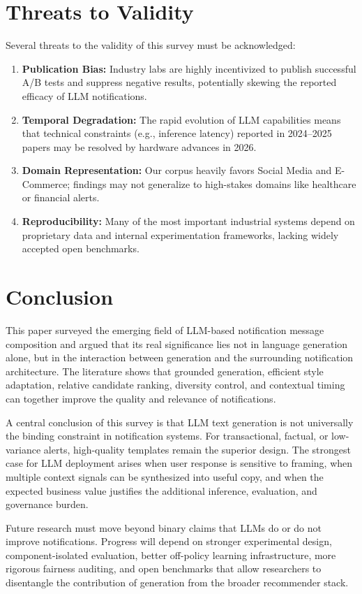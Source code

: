 \documentclass[sigconf]{acmart}
\begin{document}
\section{Threats to Validity}

Several threats to the validity of this survey must be acknowledged:
\begin{enumerate}
    \item \textbf{Publication Bias:} Industry labs are highly incentivized to publish successful A/B tests and suppress negative results, potentially skewing the reported efficacy of LLM notifications.
    \item \textbf{Temporal Degradation:} The rapid evolution of LLM capabilities means that technical constraints (e.g., inference latency) reported in 2024--2025 papers may be resolved by hardware advances in 2026.
    \item \textbf{Domain Representation:} Our corpus heavily favors Social Media and E-Commerce; findings may not generalize to high-stakes domains like healthcare or financial alerts.
    \item \textbf{Reproducibility:} Many of the most important industrial systems depend on proprietary data and internal experimentation frameworks, lacking widely accepted open benchmarks.
\end{enumerate}

\section{Conclusion}

This paper surveyed the emerging field of LLM-based notification message composition and argued that its real significance lies not in language generation alone, but in the interaction between generation and the surrounding notification architecture. The literature shows that grounded generation, efficient style adaptation, relative candidate ranking, diversity control, and contextual timing can together improve the quality and relevance of notifications. 

A central conclusion of this survey is that LLM text generation is not universally the binding constraint in notification systems. For transactional, factual, or low-variance alerts, high-quality templates remain the superior design. The strongest case for LLM deployment arises when user response is sensitive to framing, when multiple context signals can be synthesized into useful copy, and when the expected business value justifies the additional inference, evaluation, and governance burden.

Future research must move beyond binary claims that LLMs do or do not improve notifications. Progress will depend on stronger experimental design, component-isolated evaluation, better off-policy learning infrastructure, more rigorous fairness auditing, and open benchmarks that allow researchers to disentangle the contribution of generation from the broader recommender stack.



\end{document}
